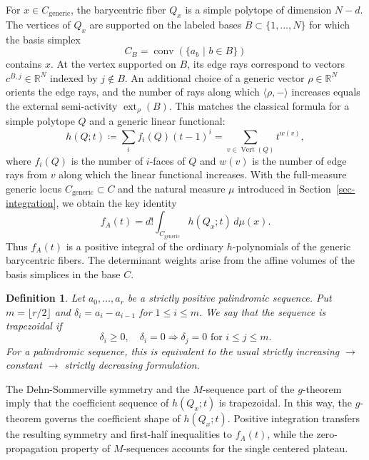 \documentclass[12pt]{amsart}
\newtheorem{definition}[theorem]{Definition}
\numberwithin{equation}{section}
\numberwithin{theorem}{section}
\newcommand{\op}{\operatorname}
\newcommand{\R}{\mathbb{R}}
\begin{document}
For $x\in C_{\mathrm{generic}}$, the barycentric fiber $Q_x$ is a simple polytope of dimension $N-d$. The vertices of $Q_x$ are supported on the labeled bases $B\subset \{1,\dots,N\}$ for which the basis simplex
\begin{equation*}
  C_B=\op{conv}(\{a_b\,\,|\,\,b\in B\})
\end{equation*}
contains $x$. At the vertex supported on $B$, its edge rays correspond to vectors $c^{B,j}\in\R^N$ indexed by $j\notin B$. An additional choice of a generic vector $\rho\in\R^N$ orients the edge rays, and the number of rays along which $\langle\rho,-\rangle$ increases equals the external semi-activity $\op{ext}_\rho(B)$.
This matches the classical formula for a simple polytope $Q$ and a generic linear functional:
\begin{equation*}
  h(Q;t)\coloneqq \sum_i f_i(Q)(t-1)^i = \sum_{v\in \op{Vert}(Q)}t^{w(v)},
\end{equation*}
where $f_i(Q)$ is the number of $i$-faces of $Q$ and $w(v)$ is the number of edge rays from $v$ along which the linear functional increases. 
With the full-measure generic locus $C_{\mathrm{generic}}\subset C$ and the natural measure $\mu$ introduced in Section~\ref{sec-integration}, we obtain the key identity
\begin{equation}
  \label{eq-intro-barycentric-formula}
  f_A(t) = d!\int_{C_{\mathrm{generic}}} h(Q_x;t)\,d\mu(x).
\end{equation}
Thus $f_A(t)$ is a positive integral of the ordinary $h$-polynomials of the generic barycentric fibers. The determinant weights arise from the affine volumes of the basis simplices in the base $C$.

\begin{definition}
  \label{def-trapezoidal}
  Let $a_0,\dots,a_r$ be a strictly positive palindromic sequence. Put $m=\lfloor r/2\rfloor$ and $\delta_i=a_i-a_{i-1}$ for $1\leq i\leq m$.
  We say that the sequence is \emph{ trapezoidal} if
  \begin{equation}
    \delta_i\geq 0,\quad \delta_i=0 \Longrightarrow \delta_j=0\text{  for  } i\leq j\leq m.
  \end{equation}
  For a palindromic sequence, this is equivalent to the usual strictly increasing $\to$ constant $\to$ strictly decreasing formulation.
\end{definition}

The Dehn-Sommerville symmetry and the $M$-sequence part of the $g$-theorem \cite[Theorem~8.35]{Zie} imply that the coefficient sequence of $h(Q_x;t)$ is trapezoidal. In this way, the $g$-theorem governs the
coefficient shape of $h(Q_x;t)$. Positive integration transfers the
resulting symmetry and first-half inequalities to $f_A(t)$, while
the zero-propagation property of $M$-sequences accounts for the
single centered plateau.
\end{document}
